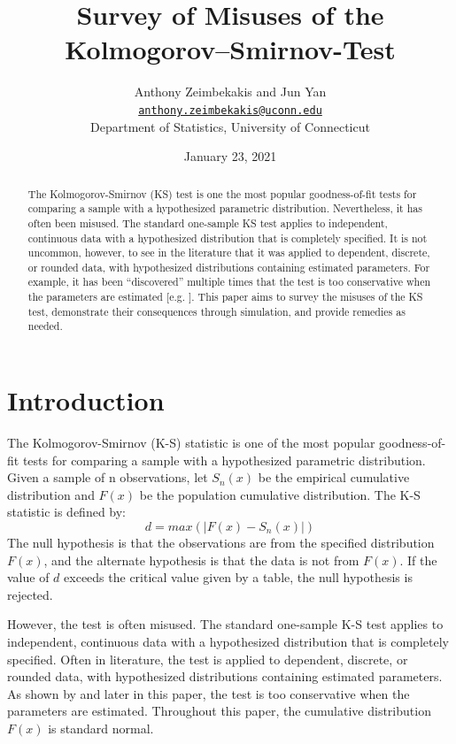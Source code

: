 \documentclass[12pt, letterpaper, titlepage]{article}
\title{Survey of Misuses of the Kolmogorov–Smirnov-Test}
\author{Anthony Zeimbekakis and Jun Yan\\
\href{mailto:anthony.zeimbekakis@uconn.edu}{\nolinkurl{anthony.zeimbekakis@uconn.edu}}\\
Department of Statistics, University of Connecticut}
\date{January 23, 2021}
\begin{document}
\maketitle

\doublespace

\begin{abstract}
The Kolmogorov-Smirnov (KS) test is one the most popular goodness-of-fit tests for comparing a sample with a hypothesized parametric distribution. Nevertheless, it has often been misused. The standard one-sample KS test applies to independent, continuous data with a hypothesized distribution that is completely specified. It is not uncommon, however, to see in the literature that it was applied to dependent, discrete, or rounded data, with hypothesized distributions containing estimated parameters. For example, it has been “discovered” multiple times that the test is too conservative when the parameters are estimated [e.g. \citet{Steinskog}]. This paper aims to survey the misuses of the KS test, demonstrate their consequences through simulation, and provide remedies as needed.
\end{abstract}


\hypertarget{sec:intro}{%
\section{Introduction}\label{sec:intro}}

The Kolmogorov-Smirnov (K-S) statistic is one of the most popular goodness-of-fit tests for comparing a sample with a hypothesized parametric distribution. Given a sample of n observations, let $S_{n}(x)$ be the empirical cumulative distribution and $F(x)$ be the population cumulative distribution. The K-S statistic is defined by: \[d = max(\lvert F(x)-S_{n}(x) \rvert)\] The null hypothesis is that the observations are from the specified distribution $F(x)$, and the alternate hypothesis is that the data is not from $F(x)$. If the value of $d$ exceeds the critical value given by a table, the null hypothesis is rejected.

However, the test is often misused. The standard one-sample K-S test applies to independent, continuous data with a hypothesized distribution that is completely specified. Often in literature, the test is applied to dependent, discrete, or rounded data, with hypothesized distributions containing estimated parameters. As shown by \citet{Steinskog} and later in this paper, the test is too conservative when the parameters are estimated. Throughout this paper, the cumulative distribution $F(x)$ is standard normal.
\end{document}
